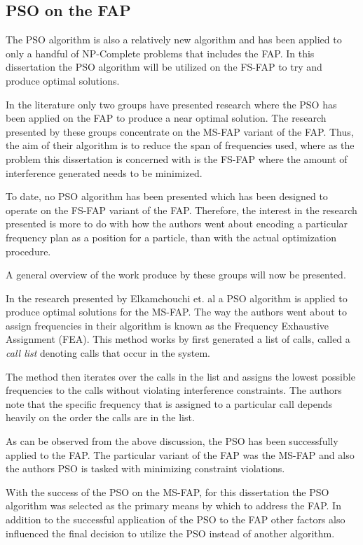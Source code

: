 \subsection{PSO on the FAP}
\label{sec:psoonfap}
The PSO algorithm is also a relatively new algorithm and has been applied to only a handful of NP-Complete problems that includes the FAP. In this dissertation the PSO algorithm will be utilized on the FS-FAP to try and produce optimal solutions. 

In the literature only two groups have presented research where the PSO has been applied on the FAP to produce a near optimal solution. The research presented by these groups concentrate on the MS-FAP variant of the FAP. Thus, the aim of their algorithm is to reduce the span of frequencies used, where as the problem this dissertation is concerned with is the FS-FAP where the amount of interference generated needs to be minimized. 

To date, no PSO algorithm has been presented which has been designed to operate on the FS-FAP variant of the FAP. Therefore, the interest in the research presented is more to do with how the authors went about encoding a particular frequency plan as a position for a particle, than with the actual optimization procedure.

A general overview of the work produce by these groups will now be presented.

In the research presented by Elkamchouchi et. al\cite{EgyptFAPPSO} a PSO algorithm is applied to produce optimal solutions for the MS-FAP. The way the authors went about to assign frequencies in their algorithm is known as the Frequency Exhaustive Assignment (FEA).
This method works by first generated a list of calls, called a \emph{call list} denoting calls that occur in the system\cite{EgyptFAPPSO}. 

The method then iterates over the calls in the list and assigns the lowest possible frequencies to the calls without violating interference constraints\cite{EgyptFAPPSO}. The authors note that the specific frequency that is assigned to a particular call depends heavily on the order the calls are in the list\cite{EgyptFAPPSO}.

As can be observed from the above discussion, the PSO has been successfully applied to the FAP. The particular variant of the FAP was the MS-FAP and also the authors PSO is tasked with minimizing constraint violations.

With the success of the PSO on the MS-FAP, for this dissertation the PSO algorithm was selected as the primary means by which to address the FAP. In addition to the successful application of the PSO to the FAP other factors also influenced the final decision to utilize the PSO instead of another algorithm.

